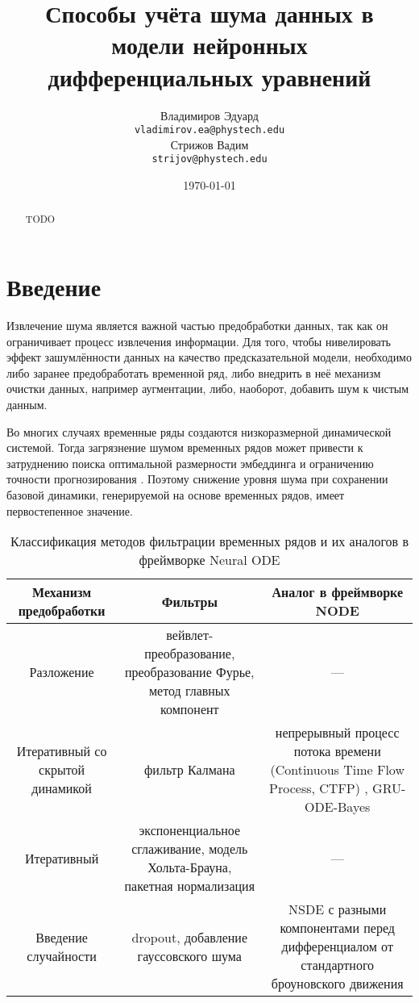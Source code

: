 \documentclass[a4paper, 14pt]{article}
\title{Способы учёта шума данных в модели нейронных дифференциальных уравнений}
\author{Владимиров Эдуард \\
	\texttt{vladimirov.ea@phystech.edu} \\
	
	\And
	Стрижов Вадим \\
	\texttt{strijov@phystech.edu}
}
\date{\today}
\begin{document}
	\maketitle
	
	\begin{abstract}
		TODO
	\end{abstract}
	
	
	\section{Введение}
	Извлечение шума является важной частью предобработки данных, так как он ограничивает процесс извлечения информации. 
	Для того, чтобы нивелировать эффект зашумлённости данных на качество предсказательной модели, необходимо либо заранее предобработать временной ряд, либо внедрить в неё механизм очистки данных, например аугментации, либо, наоборот, добавить шум к чистым данным.
	
	Во многих случаях временные ряды создаются низкоразмерной динамической системой.
	Тогда загрязнение шумом временных рядов может привести к затруднению поиска оптимальной размерности эмбеддинга \cite{kostelich1990noise} и ограничению точности прогнозирования \cite{elshorbagy2002noise}. Поэтому снижение
	уровня шума при сохранении базовой динамики, генерируемой на основе временных рядов, имеет первостепенное значение.
	
	\begin{table}[bhtp]
		\caption{Классификация методов фильтрации временных рядов и их аналогов в фреймворке Neural ODE}
		\begin{tabulary}{\textwidth}{|C|C|C|}
			\hline
			\textbf{Механизм предобработки} & \textbf{Фильтры} & \textbf{Аналог в фреймворке NODE} 
			\\ \hline
			Разложение & вейвлет-преобразование, преобразование Фурье, метод главных компонент & --- 
			\\ \hline
			Итеративный со скрытой динамикой & фильтр Калмана & непрерывный процесс потока времени (Continuous Time Flow Process, CTFP) \cite{Deng2020}, GRU-ODE-Bayes \cite{DeBrouwer2020}
			\\ \hline
			Итеративный & экспоненциальное сглаживание, модель Хольта-Брауна, пакетная нормализация & ---
			\\ \hline
			Введение случайности & dropout, добавление гауссовского шума
			& NSDE с разными компонентами перед дифференциалом от стандартного броуновского движения \cite{Liu2019}
			\\ \hline
		\end{tabulary}
	\end{table}
	
\end{document}
